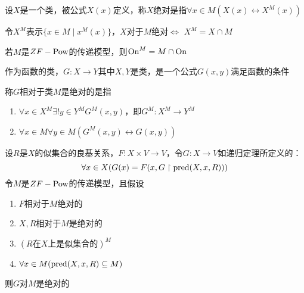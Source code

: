 \documentclass[11pt]{article}
\begin{document}
设\(X\)是一个类，被公式\(X(x)\)定义，称\(X\)绝对是指\(\forall x\in M(X(x)\leftrightarrow X^M(x))\)

令\(X^M\)表示\(\{x\in M\mid x^M(x)\}\)，\(X\)对于\(M\)绝对\(\Leftrightarrow\) \(X^M=X\cap M\)

若\(M\)是\(ZF-\operatorname{Pow}\)的传递模型，则\(\operatorname{On}^M=M\cap\operatorname{On}\)

作为函数的类，\(G:X\to Y\)其中\(X,Y\)是类，是一个公式\(G(x,y)\)满足函数的条件

称\(G\)相对于类\(M\)是绝对的是指
\begin{enumerate}
\item \(\forall x\in X^M\exists!y\in Y^MG^M(x,y)\)，即\(G^M:X^M\to Y^M\)
\item \(\forall x\in M\forall y\in M(G^M(x,y)\leftrightarrow G(x,y))\)
\end{enumerate}


\begin{theorem}[]
设\(R\)是\(X\)的似集合的良基关系，\(F:X\times V\to V\)，令\(G:X\to V\)如递归定理所定义的：
\begin{equation*}
\forall x\in X(G(x)=F(x,G\upharpoonright\text{pred}(X,x,R)))
\end{equation*}
令\(M\)是\(ZF-\operatorname{Pow}\)的传递模型，且假设
\begin{enumerate}
\item \(F\)相对于\(M\)绝对的
\item \(X,R\)相对于\(M\)是绝对的
\item \((R\text{在$X$上是似集合的})^M\)
\item \(\forall x\in M(\text{pred}(X,x,R)\subseteq M)\)
\end{enumerate}
则\(G\)对\(M\)是绝对的
\end{theorem}
\end{document}
